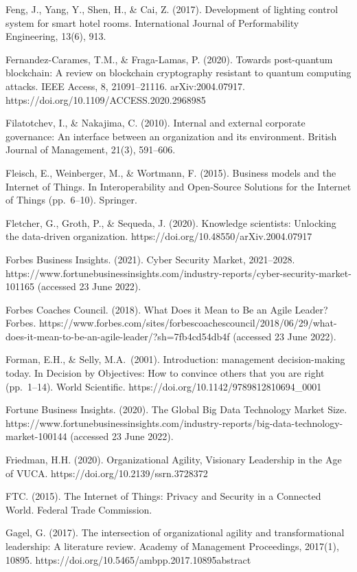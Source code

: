 \documentclass[
  letterpaper,
  DIV=11,
  numbers=noendperiod]{scrreprt}
\begin{document}
Feng, J., Yang, Y., Shen, H., \& Cai, Z. (2017). Development of lighting
control system for smart hotel rooms. International Journal of
Performability Engineering, 13(6), 913.

Fernandez-Carames, T.M., \& Fraga-Lamas, P. (2020). Towards post-quantum
blockchain: A review on blockchain cryptography resistant to quantum
computing attacks. IEEE Access, 8, 21091--21116. arXiv:2004.07917.
https://doi.org/10.1109/ACCESS.2020.2968985

Filatotchev, I., \& Nakajima, C. (2010). Internal and external corporate
governance: An interface between an organization and its environment.
British Journal of Management, 21(3), 591--606.

Fleisch, E., Weinberger, M., \& Wortmann, F. (2015). Business models and
the Internet of Things. In Interoperability and Open-Source Solutions
for the Internet of Things (pp.~6--10). Springer.

Fletcher, G., Groth, P., \& Sequeda, J. (2020). Knowledge scientists:
Unlocking the data-driven organization.
https://doi.org/10.48550/arXiv.2004.07917

Forbes Business Insights. (2021). Cyber Security Market, 2021--2028.
https://www.fortunebusinessinsights.com/industry-reports/cyber-security-market-101165
(accessed 23 June 2022).

Forbes Coaches Council. (2018). What Does it Mean to Be an Agile Leader?
Forbes.
https://www.forbes.com/sites/forbescoachescouncil/2018/06/29/what-does-it-mean-to-be-an-agile-leader/?sh=7fb4cd54db4f
(accessed 23 June 2022).

Forman, E.H., \& Selly, M.A.~(2001). Introduction: management
decision-making today. In Decision by Objectives: How to convince others
that you are right (pp.~1--14). World Scientific.
https://doi.org/10.1142/9789812810694\_0001

Fortune Business Insights. (2020). The Global Big Data Technology Market
Size.
https://www.fortunebusinessinsights.com/industry-reports/big-data-technology-market-100144
(accessed 23 June 2022).

Friedman, H.H. (2020). Organizational Agility, Visionary Leadership in
the Age of VUCA. https://doi.org/10.2139/ssrn.3728372

FTC. (2015). The Internet of Things: Privacy and Security in a Connected
World. Federal Trade Commission.

Gagel, G. (2017). The intersection of organizational agility and
transformational leadership: A literature review. Academy of Management
Proceedings, 2017(1), 10895.
https://doi.org/10.5465/ambpp.2017.10895abstract
\end{document}
